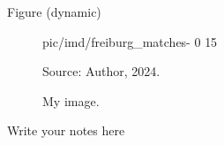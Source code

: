 \documentclass[aspectratio=169]{beamer}
\newcommand{\source}[1]{\par\tiny Source: #1} %
\begin{document}
        \begin{frame}{Figure (dynamic)}
            \begin{figure}
                \centering
                {pic/imd/freiburg_matches-} %
                {0} %
                {15} %
                \caption{My image.}
                \source{Author, 2024.}
            \end{figure}

            \begin{note}
                {Write your notes here}
            \end{note}
        \end{frame}
\end{document}
